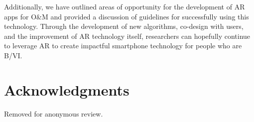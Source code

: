 \documentclass[chi_draft]{sigchi}
\newcommand{\BVI}{B/VI\xspace}
\newcommand{\OM}{O\&M\xspace}
\begin{document}
Additionally, we have outlined areas of opportunity for the development of AR apps for \OM and provided a discussion of guidelines for successfully using this technology.  Through the development of new algorithms, co-design with users, and the improvement of AR technology itself, researchers can hopefully continue to leverage AR to create impactful smartphone technology for people who are \BVI.  
%
\section{Acknowledgments}
Removed for anonymous review.

\balance{}



\end{document}
